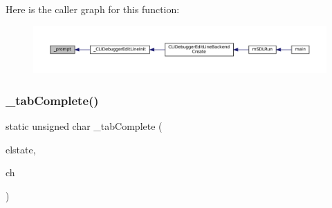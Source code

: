 Here is the caller graph for this function\+:
\nopagebreak
\begin{figure}[H]
\begin{center}
\leavevmode
\includegraphics[width=350pt]{cli-el-backend_8c_a5e71c0be13cd0712fef8e1cb99cd2248_icgraph}
\end{center}
\end{figure}
\mbox{\label{cli-el-backend_8c_ac8fc3ad07748126ae6a19a218f312411}} 
\subsubsection{\texorpdfstring{\+\_\+tab\+Complete()}{\_tabComplete()}}
{\footnotesize\ttfamily static unsigned char \+\_\+tab\+Complete (\begin{DoxyParamCaption}\item[{Edit\+Line $\ast$}]{elstate,  }\item[{\mbox{\hyperlink{ioapi_8h_a787fa3cf048117ba7123753c1e74fcd6}{int}}}]{ch }\end{DoxyParamCaption})\hspace{0.3cm}{\ttfamily [static]}}

